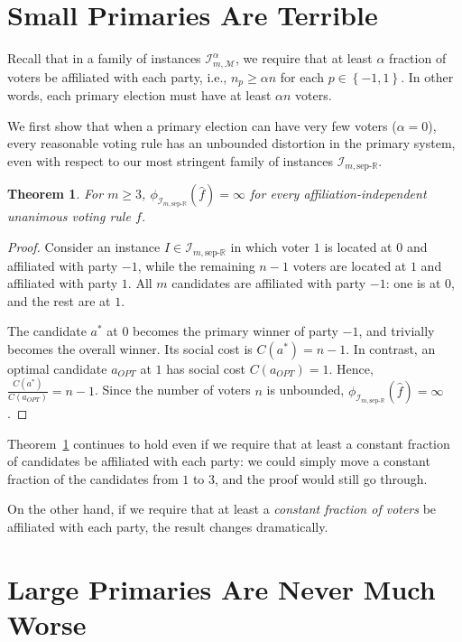 \documentclass[letterpaper]{article} %
\newtheorem{theorem}{Theorem}
\theoremstyle{definition}
\newcommand{\set}[1]{\left\{#1\right\}}
\renewcommand{\hat}{\widehat}
\newcommand{\bbR}{\mathbb{R}}
\newcommand{\calI}{\mathcal{I}}
\newcommand{\calM}{\mathcal{M}}
\newcommand{\pleft}{-1}
\newcommand{\pright}{1}
\newcommand{\sep}{\textrm{sep-}}
\newcommand{\eucline}{\bbR}
\newcommand{\euclinesep}{\sep\eucline}
\newcommand{\I}{\calI}
\begin{document}
\section{Small Primaries Are Terrible}
\label{sec:small-primaries}

Recall that in a family of instances $\I_{m,\calM}^{\alpha}$, we require that at least $\alpha$ fraction of voters be affiliated with each party, i.e., $n_p \ge \alpha n$ for each $p \in \set{\pleft,\pright}$. In other words, each primary election must have at least $\alpha n$ voters.

We first show that when a primary election can have very few voters ($\alpha = 0$), every reasonable voting rule has an unbounded distortion in the primary system, even with respect to our most stringent family of instances $\I_{m,\euclinesep}$.
\begin{theorem}
	For $m \ge 3$, $\phi_{\I_{m,\euclinesep}}(\hat{f}) = \infty$ for every affiliation-independent unanimous voting rule $f$.
\label{thm:small-primaries-bad}
\end{theorem}
\begin{proof}
	Consider an instance $I \in \I_{m,\euclinesep}$ in which voter $1$ is located at $0$ and affiliated with party $\pleft$, while the remaining $n-1$ voters are located at $1$ and affiliated with party $\pright$. All $m$ candidates are affiliated with party $\pleft$: one is at $0$, and the rest are at $1$.

	The candidate $a^*$ at $0$ becomes the primary winner of party $\pleft$, and trivially becomes the overall winner. Its social cost is $C(a^*) = n-1$. In contrast, an optimal candidate $a_{OPT}$ at $1$ has social cost $C(a_{OPT}) = 1$. Hence, $\frac{C(a^*)}{C(a_{OPT})} = n-1$. Since the number of voters $n$ is unbounded, $\phi_{\I_{m,\euclinesep}}(\hat{f}) = \infty$.
\end{proof}

Theorem~\ref{thm:small-primaries-bad} continues to hold even if we require that at least a constant fraction of candidates be affiliated with each party: we could simply move a constant fraction of the candidates from $1$ to $3$, and the proof would still go through.

On the other hand, if we require that at least a \emph{constant fraction of voters} be affiliated with each party, the result changes dramatically.

\section{Large Primaries Are Never Much Worse}
\label{sec:large-primaries-good}
\end{document}
